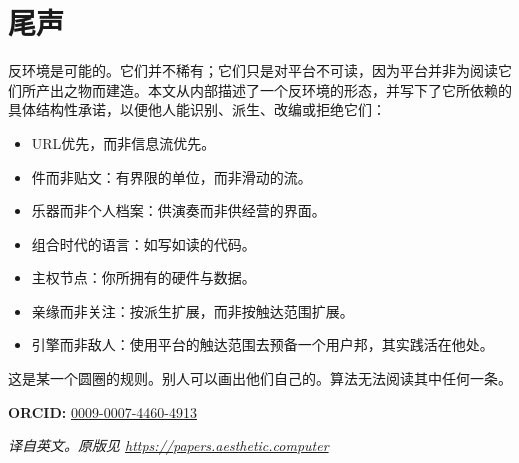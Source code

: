 \documentclass[10pt,letterpaper,twocolumn]{article}
\begin{document}
\section{尾声}

反环境是可能的。它们并不稀有；它们只是对平台不可读，因为平台并非为阅读它们所产出之物而建造。本文从内部描述了一个反环境的形态，并写下了它所依赖的具体结构性承诺，以便他人能识别、派生、改编或拒绝它们：

\begin{itemize}
  \item URL优先，而非信息流优先。
  \item 件而非贴文：有界限的单位，而非滑动的流。
  \item 乐器而非个人档案：供演奏而非供经营的界面。
  \item 组合时代的语言：如写如读的代码。
  \item 主权节点：你所拥有的硬件与数据。
  \item 亲缘而非关注：按派生扩展，而非按触达范围扩展。
  \item 引擎而非敌人：使用平台的触达范围去预备一个用户邦，其实践活在他处。
\end{itemize}

这是某一个圆圈的规则。别人可以画出他们自己的。算法无法阅读其中任何一条。

\vspace{0.5em}
\noindent\textbf{ORCID:} \href{https://orcid.org/0009-0007-4460-4913}{0009-0007-4460-4913}

\vspace{0.5em}
\noindent\textit{译自英文。原版见 \url{https://papers.aesthetic.computer}}



\end{document}
